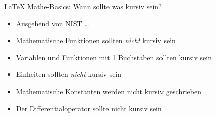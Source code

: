 \documentclass[main.tex]{subfiles}
\begin{document}
\begin{frame}{\LaTeX{} Mathe-Basics: Wann sollte was kursiv sein?}
	\begin{itemize}
		\item Ausgehend von \href{https://physics.nist.gov/cuu/pdf/typefaces.pdf}{NIST} \ldots
		      \pause
		      \medskip
		\item Mathematische Funktionen sollten \textit{nicht} kursiv sein
		      \pause

		\item Variablen und Funktionen mit 1 Buchstaben sollten kursiv sein
		      \pause

		\item Einheiten sollten \textit{nicht} kursiv sein
		      \pause

		\item Mathematische Konstanten werden nicht kursiv geschrieben
		      \pause

		\item Der Differentialoperator sollte nicht kursiv sein
	\end{itemize}
\end{frame}
\end{document}
